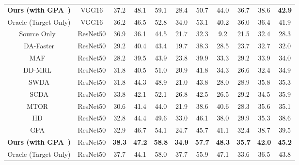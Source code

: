 \documentclass[10pt,journal,compsoc]{IEEEtran}
\begin{document}
\begin{table*}
{{\begin{tabular}{c|c|cccccccc|c}
\textbf{Ours (with GPA~\cite{GPA})}& VGG16 &37.2 &48.1 &59.1 &28.4 &50.7 &44.0 &36.7 &38.6 &\textbf{42.9}\\
Oracle (Target Only) & VGG16 &36.2 &46.5 &52.8 &34.0 &53.1 &40.2 &36.0 &36.4 &41.9\\
\midrule
Source Only~\cite{ren2016faster}  &ResNet50 & 36.9 &36.1 & 44.5 &21.7 &32.3 &9.2 &21.5 &32.4 &28.3 \\
DA-Faster\cite{DA-Faster-RCNN} & ResNet50 & 29.2 & 40.4 & 43.4 & 19.7 & 38.3 & 28.5 & 23.7 & 32.7 & 32.0  \\
MAF~\cite{MAF}&ResNet50 &28.2 &39.5 &43.9 &23.8 &39.9 &33.3 &29.2 &33.9 &34.0 \\
DD-MRL~\cite{DDMRL}&ResNet50 & 31.8 & 40.5 & 51.0 & 20.9 & 41.8 & 34.3 & 26.6 & 32.4 & 34.9 \\
SWDA\cite{SWDA} & ResNet50 & 31.8 & 44.3 & 48.9 & 21.0 & 43.8 & 28.0 & 28.9 & 35.8 & 35.3   \\
SCDA\cite{SCDA}  & ResNet50 & 33.8 & 42.1 & 52.1 & 26.8 & 42.5 & 26.5 & 29.2 & 34.5 & 35.9  \\
MTOR~\cite{MTOR} &ResNet50 & 30.6 & 41.4 & 44.0 & 21.9 & 38.6 & 40.6 & 28.3 & 35.6 & 35.1 \\
IID~\cite{IID} & ResNet50 & 32.8 & 44.4 & 49.6 & 33.0 & 46.1 & 38.0 & 29.9 &35.3 &38.6 \\
\midrule
GPA~\cite{GPA}&ResNet50 &32.9 &46.7 &54.1 &24.7 &45.7 &41.1 &32.4 &38.7 &39.5 \\
\textbf{Ours (with GPA~\cite{GPA})}& ResNet50 &\textbf{38.3} & \textbf{47.2} & \textbf{58.8} & \textbf{34.9} & \textbf{57.7} & \textbf{48.3} & \textbf{35.7} & \textbf{42.0} & \textbf{45.2} \\
Oracle (Target Only) & ResNet50 &37.7 &44.1 &58.0 &37.7 &55.9 &47.1 &33.6 &36.5 &43.8\\
\bottomrule
\end{tabular}
}
}
\end{table*}
\end{document}
